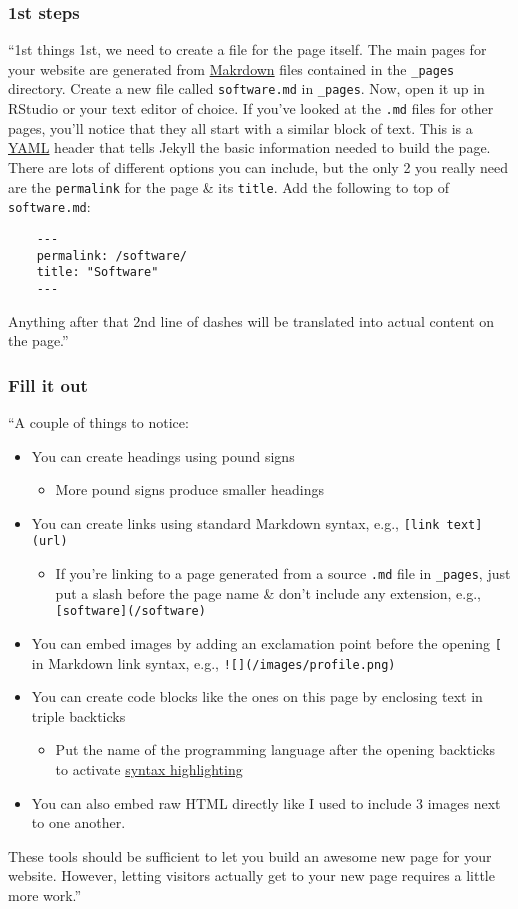 \documentclass{article}
\numberwithin{equation}{section}
\begin{document}
\subsubsection{1st steps}
``1st things 1st, we need to create a file for the page itself. The main pages for your website are generated from \href{https://en.wikipedia.org/wiki/Markdown}{Makrdown} files contained in the \verb|_pages| directory. Create a new file called \texttt{software.md} in \verb|_pages|. Now, open it up in RStudio or your text editor of choice. If you've looked at the \texttt{.md} files for other pages, you'll notice that they all start with a similar block of text. This is a \href{https://en.wikipedia.org/wiki/YAML}{YAML} header that tells Jekyll the basic information needed to build the page. There are lots of different options you can include, but the only 2 you really need are the \texttt{permalink} for the page \& its \texttt{title}. Add the following to top of \texttt{software.md}:
\begin{verbatim}
	---
	permalink: /software/
	title: "Software"
	---
\end{verbatim}
Anything after that 2nd line of dashes will be translated into actual content on the page.''

\subsubsection{Fill it out}
``A couple of things to notice:
\begin{itemize}
	\item You can create headings using pound signs
	\begin{itemize}
		\item More pound signs produce smaller headings
	\end{itemize}
	\item You can create links using standard Markdown syntax, e.g., \texttt{[link text] (url)}
	\begin{itemize}
		\item If you're linking to a page generated from a source \texttt{.md} file in \verb|_pages|, just put a slash before the page name \& don't include any extension, e.g., \texttt{[software](/software)}
	\end{itemize}
	\item You can embed images by adding an exclamation point before the opening \texttt{[} in Markdown link syntax, e.g., \texttt{![](/images/profile.png)}
	\item You can create code blocks like the ones on this page by enclosing text in triple backticks
	\begin{itemize}
		\item Put the name of the programming language after the opening backticks to activate \href{https://en.wikipedia.org/wiki/Syntax_highlighting}{syntax highlighting}
	\end{itemize}
	\item You can also embed raw HTML directly like I used to include 3 images next to one another.
\end{itemize}
These tools should be sufficient to let you build an awesome new page for your website. However, letting visitors actually get to your new page requires a little more work.''
\end{document}
